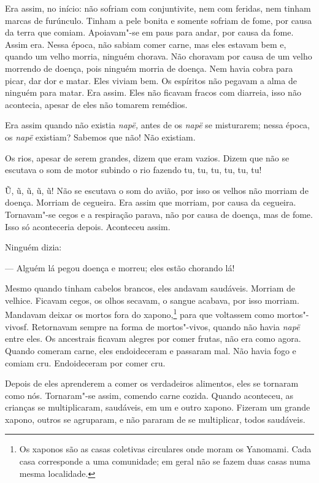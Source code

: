 Era assim, no início: não sofriam com conjuntivite, nem com feridas, nem
tinham marcas de furúnculo. Tinham a pele bonita e somente sofriam de
fome, por causa da terra que comiam. Apoiavam"-se em paus para andar, por
causa da fome. Assim era. Nessa época, não sabiam comer carne, mas eles
estavam bem e, quando um velho morria, ninguém chorava. Não choravam por
causa de um velho morrendo de doença, pois ninguém morria de doença. Nem
havia cobra para picar, dar dor e matar. Eles viviam bem. Os espíritos
não pegavam a alma de ninguém para matar. Era assim. Eles não ficavam
fracos com diarreia, isso não acontecia, apesar de eles não tomarem
remédios. 

Era assim quando não existia \emph{napë,} antes de os \emph{napë} se
misturarem; nessa época, os \emph{napë} existiam? Sabemos que não! Não
existiam. 

Os rios, apesar de serem grandes, dizem que eram vazios. Dizem que não
se escutava o som de motor subindo o rio fazendo tu, tu, tu, tu, tu,
tu!

Ũ, ũ, ũ, ũ, ũ! Não se escutava o som do avião, por isso os velhos
não morriam de doença. Morriam de cegueira. Era assim que morriam, por
causa da cegueira. Tornavam"-se cegos e a respiração parava, não por
causa de doença, mas de fome. Isso só aconteceria depois. Aconteceu
assim. 

Ninguém dizia:

--- Alguém lá pegou doença e morreu; eles estão chorando lá! 

Mesmo quando tinham cabelos brancos, eles andavam saudáveis. Morriam de
velhice. Ficavam cegos, os olhos secavam, o sangue acabava, por isso
morriam. Mandavam deixar os mortos fora do xapono,\footnote{  Os xaponos são as casas coletivas circulares onde moram os Yanomami. Cada casa corresponde a uma comunidade; em geral não se fazem duas casas numa mesma localidade.} para que voltassem
como mortos"-vivosf. Retornavam sempre na forma de
mortos"-vivos, quando não havia \emph{napë} entre eles. Os ancestrais
ficavam alegres por comer frutas, não era como agora. Quando comeram
carne, eles endoideceram e passaram mal. Não havia fogo e comiam cru.
Endoideceram por comer cru.

Depois de eles aprenderem a comer os verdadeiros alimentos, eles se
tornaram como nós. Tornaram"-se assim, comendo carne cozida. Quando
aconteceu, as crianças se multiplicaram, saudáveis, em um e outro
xapono. Fizeram um grande xapono, outros se agruparam, e não
pararam de se multiplicar, todos saudáveis.

 
